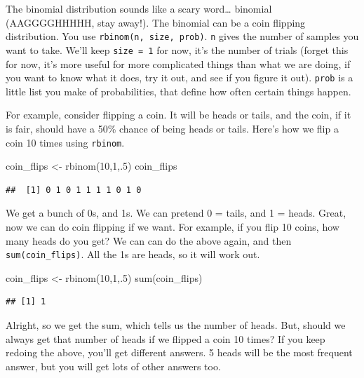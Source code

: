 \documentclass[
]{book}
\newenvironment{Shaded}{\begin{snugshade}}{\end{snugshade}}
\newcommand{\DecValTok}[1]{\textcolor[rgb]{0.00,0.00,0.81}{#1}}
\newcommand{\FunctionTok}[1]{\textcolor[rgb]{0.00,0.00,0.00}{#1}}
\newcommand{\NormalTok}[1]{#1}
\newcommand{\OtherTok}[1]{\textcolor[rgb]{0.56,0.35,0.01}{#1}}
\begin{document}
The binomial distribution sounds like a scary word\ldots{} binomial (AAGGGGHHHHH, stay away!). The binomial can be a coin flipping distribution. You use \texttt{rbinom(n,\ size,\ prob)}. \texttt{n} gives the number of samples you want to take. We'll keep \texttt{size\ =\ 1} for now, it's the number of trials (forget this for now, it's more useful for more complicated things than what we are doing, if you want to know what it does, try it out, and see if you figure it out). \texttt{prob} is a little list you make of probabilities, that define how often certain things happen.

For example, consider flipping a coin. It will be heads or tails, and the coin, if it is fair, should have a 50\% chance of being heads or tails. Here's how we flip a coin 10 times using \texttt{rbinom}.

\begin{Shaded}
\begin{Highlighting}[]
\NormalTok{coin\_flips }\OtherTok{\textless{}{-}} \FunctionTok{rbinom}\NormalTok{(}\DecValTok{10}\NormalTok{,}\DecValTok{1}\NormalTok{,.}\DecValTok{5}\NormalTok{)}
\NormalTok{coin\_flips}
\end{Highlighting}
\end{Shaded}

\begin{verbatim}
##  [1] 0 1 0 1 1 1 1 0 1 0
\end{verbatim}

We get a bunch of 0s, and 1s. We can pretend 0 = tails, and 1 = heads. Great, now we can do coin flipping if we want. For example, if you flip 10 coins, how many heads do you get? We can can do the above again, and then \texttt{sum(coin\_flips)}. All the 1s are heads, so it will work out.

\begin{Shaded}
\begin{Highlighting}[]
\NormalTok{coin\_flips }\OtherTok{\textless{}{-}} \FunctionTok{rbinom}\NormalTok{(}\DecValTok{10}\NormalTok{,}\DecValTok{1}\NormalTok{,.}\DecValTok{5}\NormalTok{)}
\FunctionTok{sum}\NormalTok{(coin\_flips)}
\end{Highlighting}
\end{Shaded}

\begin{verbatim}
## [1] 1
\end{verbatim}

Alright, so we get the sum, which tells us the number of heads. But, should we always get that number of heads if we flipped a coin 10 times? If you keep redoing the above, you'll get different answers. 5 heads will be the most frequent answer, but you will get lots of other answers too.
\end{document}
